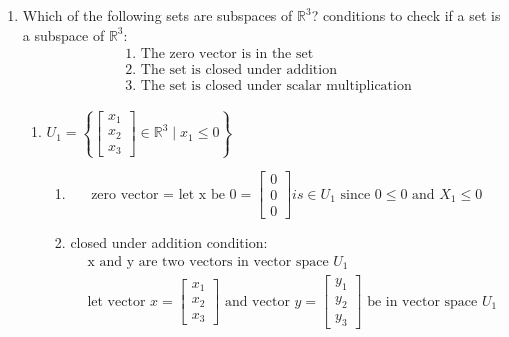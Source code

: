 \documentclass[11pt]{article}
\begin{document}
\begin{enumerate}
\begin{enumerate}
\item 

\end{enumerate}

\item Which of the following sets are subspaces of \( \mathbb{R}^3 \)?\newline
conditions to check if a set is a subspace of \( \mathbb{R}^3 \):
\[
    \begin{aligned}
        &\text{1. The zero vector is in the set} \\
        &\text{2. The set is closed under addition} \\
        &\text{3. The set is closed under scalar multiplication}
    \end{aligned}
\]
\begin{enumerate}
    \item \( U_1 = \left\{ \begin{bmatrix}
        x_1 \\
        x_2 \\
        x_3
        \end{bmatrix} \in \mathbb{R}^3 \mid x_1 \leq 0 \right\} \)
    \begin{enumerate}
        \item 
        \[    
        \text{zero vector = let x be 0} =
        \begin{bmatrix}
        0 \\
        0 \\
        0
        \end{bmatrix}  is \in U_1 \text{ since } 0 \leq 0 \text{ and } X_1 \leq 0
        \]
        \item closed under addition condition:
        \[
        \begin{aligned}
            &\text{x and y are two vectors in  vector space } U_1 \\
            &\text{let vector } x = \begin{bmatrix}
                x_1 \\
                x_2 \\
                x_3
            \end{bmatrix} \text{ and vector } y = \begin{bmatrix}
                y_1 \\
                y_2 \\
                y_3
            \end{bmatrix} \text{ be in vector space } U_1 \\

\end{aligned}\]
\end{enumerate}
\end{enumerate}
\end{enumerate}
\end{document}
